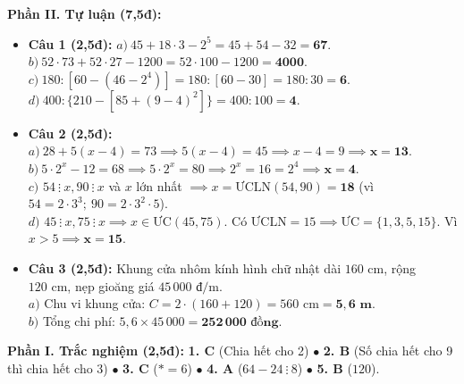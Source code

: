 \documentclass[11pt,a4paper]{article}
\newcommand{\customSubSection}[1]{%
  \vspace{1.2mm}%
  \noindent{\color{brandcyan}\bfseries\normalsize $\blacktriangleright$ #1}\par\vspace{0.4mm}%
}
\begin{document}
\textbf{Phần II. Tự luận (7,5đ):}
\begin{itemize}[leftmargin=1.3em, itemsep=1.2pt]
  \item \textbf{Câu 1 (2,5đ):}
    $a) \ 45 + 18 \cdot 3 - 2^5 = 45 + 54 - 32 = \mathbf{67}$. \quad
    $b) \ 52 \cdot 73 + 52 \cdot 27 - 1200 = 52 \cdot 100 - 1200 = \mathbf{4000}$.\\
    $c) \ 180 : [60 - (46 - 2^4)] = 180 : [60 - 30] = 180 : 30 = \mathbf{6}$. \quad
    $d) \ 400 : \{210 - [85 + (9 - 4)^2]\} = 400 : 100 = \mathbf{4}$.
  \item \textbf{Câu 2 (2,5đ):}
    $a) \ 28 + 5(x - 4) = 73 \implies 5(x - 4) = 45 \implies x - 4 = 9 \implies \mathbf{x = 13}$.\\
    $b) \ 5 \cdot 2^x - 12 = 68 \implies 5 \cdot 2^x = 80 \implies 2^x = 16 = 2^4 \implies \mathbf{x = 4}$.\\
    $c)$ $54 \ \vdots \ x, 90 \ \vdots \ x$ và $x$ lớn nhất $\implies x = \text{ƯCLN}(54, 90) = \mathbf{18}$ (vì $54 = 2 \cdot 3^3; \ 90 = 2 \cdot 3^2 \cdot 5$).\\
    $d)$ $45 \ \vdots \ x, 75 \ \vdots \ x \implies x \in \text{ƯC}(45, 75)$. Có $\text{ƯCLN} = 15 \implies \text{ƯC} = \{1, 3, 5, 15\}$. Vì $x > 5 \implies \mathbf{x = 15}$.
  \item \textbf{Câu 3 (2,5đ):} Khung cửa nhôm kính hình chữ nhật dài $160\text{ cm}$, rộng $120\text{ cm}$, nẹp gioăng giá $45\,000\text{ đ/m}$.\\
    $a)$ Chu vi khung cửa: $C = 2 \cdot (160 + 120) = 560\text{ cm} = \mathbf{5{,}6\text{ m}}$.\\
    $b)$ Tổng chi phí: $5{,}6 \times 45\,000 = \mathbf{252\,000\text{ đồng}}$.
\end{itemize}

\vspace{1mm}

\customSubSection{4. Chi tiết Mã đề 104}
\textbf{Phần I. Trắc nghiệm (2,5đ):}
\textbf{1. C} (Chia hết cho 2) \quad $\bullet$ \quad
\textbf{2. B} (Số chia hết cho 9 thì chia hết cho 3) \quad $\bullet$ \quad
\textbf{3. C} ($* = 6$) \quad $\bullet$ \quad
\textbf{4. A} ($64 - 24 \ \vdots \ 8$) \quad $\bullet$ \quad
\textbf{5. B} ($120$).
\end{document}
